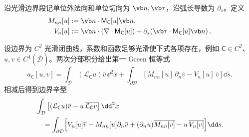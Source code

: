 沿光滑边界段记单位外法向和单位切向为 \(\vb n,\vb\tau\)，沿弧长导数为 \(\partial_s\)。定义
\begin{align}
 M_{nn}[u]
 &:=\vb n\cdot\mathsf M_{\mathsf C}[u]\vb n,
 \label{eq:phys-cont-general-Mnn}\\
 V_n[u]
 &:=\vb n\cdot(\nabla\cdot\mathsf M_{\mathsf C}[u])
 +\partial_s\!\left(\vb\tau\cdot\mathsf M_{\mathsf C}[u]\vb n\right).
 \label{eq:phys-cont-general-Vn}
\end{align}
\begin{proposition}
设边界为 $C^2$ 光滑闭曲线，系数和函数足够光滑使下式各项存在，例如 $\mathsf C\in C^2$、$u,v\in C^4(\overline{\mathcal D})$。两次分部积分给出第一 Green 恒等式
\begin{equation}
 a_{\mathsf C}[u,v]
 =\int_\mathcal D(\mathcal L_{\mathsf C}u)\overline v\,\dd^2x
 +\int_{\partial\mathcal D}
 \left[M_{nn}[u]\,\partial_n\overline v-V_n[u]\,\overline v\right]\dd s.
 \label{eq:phys-cont-general-green-first}
\end{equation}
相减后得到边界辛型
\begin{align}
 &\int_\mathcal D\left[(\mathcal L_{\mathsf C}u)\overline v
 -u\,\overline{\mathcal L_{\mathsf C}v}\right]\dd^2x\notag\\
 &\quad=\int_{\partial\mathcal D}
 \Bigl[V_n[u]\overline v-M_{nn}[u]\partial_n\overline v
 +(\partial_nu)\overline{M_{nn}[v]}-u\,\overline{V_n[v]}\Bigr]\dd s.
 \label{eq:phys-cont-general-green-second}
\end{align}
\end{proposition}

